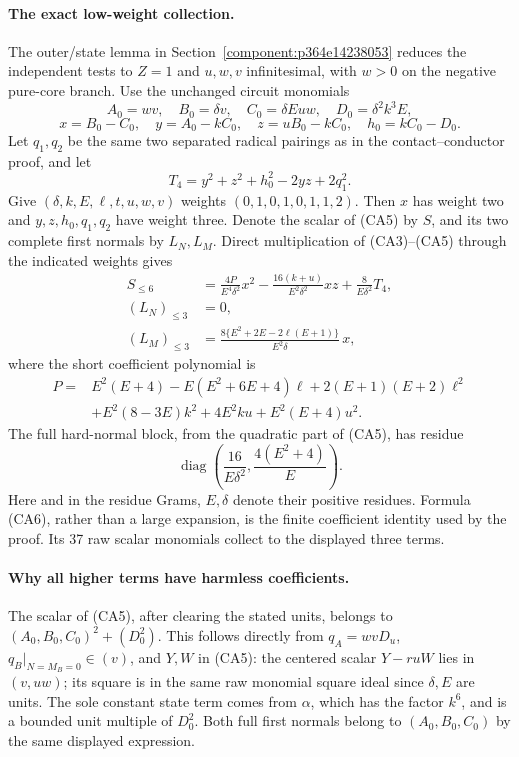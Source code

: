 \paragraph{The exact low-weight collection.}
The outer/state lemma in Section~\ref{component:p364e14238053} reduces the
independent tests to $Z=1$ and $u,w,v$ infinitesimal, with $w>0$ on
the negative pure-core branch. Use the unchanged circuit monomials
\[
 A_0=wv,\quad B_0=\delta v,\quad C_0=\delta Euw,
 \quad D_0=\delta^2k^3E,
\]
\[
 x=B_0-C_0,\quad y=A_0-kC_0,\quad
 z=uB_0-kC_0,\quad h_0=kC_0-D_0.
\]
Let $q_1,q_2$ be the same two separated radical pairings as in the
contact--conductor proof, and let
\[
 T_4=y^2+z^2+h_0^2-2yz+2q_1^2.
\]
Give $(\delta,k,E,\ell,t,u,w,v)$ weights $(0,1,0,1,0,1,1,2)$.
Then $x$ has weight two and $y,z,h_0,q_1,q_2$ have weight three.
Denote the scalar of (CA5) by $S$, and its two complete first normals
by $L_N,L_M$. Direct multiplication of (CA3)--(CA5) through the
indicated weights gives
\[
 \begin{aligned}
 S_{\le6}&=\frac{4P}{E^4\delta^2}x^2
 -\frac{16(k+u)}{E^2\delta^2}xz
 +\frac8{E\delta^2}T_4,\\
 (L_N)_{\le3}&=0,\\
 (L_M)_{\le3}&=
 \frac{8\{E^2+2E-2\ell(E+1)\}}{E^2\delta}\,x,
 \end{aligned}                                                   \tag{CA6}
\]
where the short coefficient polynomial is
\[
 \begin{split}
 P={}&E^2(E+4)-E(E^2+6E+4)\ell+2(E+1)(E+2)\ell^2\\
 &+E^2(8-3E)k^2+4E^2ku+E^2(E+4)u^2.
 \end{split}
\]
The full hard-normal block, from the quadratic part of (CA5), has
residue
\[
       \operatorname{diag}\left(\frac{16}{E\delta^2},
                                \frac{4(E^2+4)}E\right).          \tag{CA7}
\]
Here and in the residue Grams, $E,\delta$ denote their positive
residues. Formula (CA6), rather than a large expansion, is the finite
coefficient identity used by the proof. Its 37 raw scalar monomials
collect to the displayed three terms. 

\paragraph{Why all higher terms have harmless coefficients.}
The scalar of (CA5), after clearing the stated units, belongs to
$(A_0,B_0,C_0)^2+(D_0^2)$. This follows directly from $q_A=wvD_u$,
$q_B|_{N=M_B=0}\in(v)$, and $Y,W$ in (CA5): the centered scalar
$Y-r uW$ lies in $(v,uw)$; its square is in the same raw monomial
square ideal since $\delta,E$ are units. The sole constant state term
comes from $\alpha$, which has the factor $k^6$, and is a bounded
unit multiple of $D_0^2$. Both full first normals belong to
$(A_0,B_0,C_0)$ by the same displayed expression.

